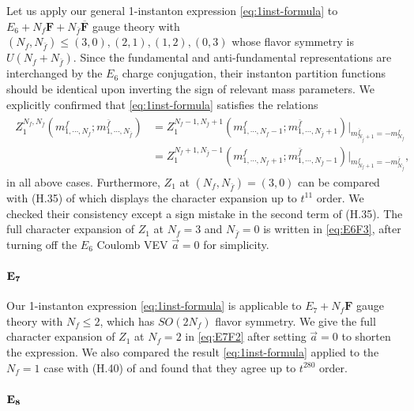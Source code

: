 \documentclass[letterpaper, 11pt]{article}
\begin{document}
{Let us apply our general 1-instanton expression \eqref{eq:1inst-formula} to $E_6 + N_f \mathbf{F} + N_{\bar{f}}\overline{\mathbf{F}}$ gauge theory with $(N_f,N_{\bar{f}}) \leq (3,0), (2,1), (1,2),(0,3)$ whose flavor symmetry is $U(N_f 
+ N_{\bar{f}})$. Since the fundamental and anti-fundamental representations are interchanged by the $E_6$ charge conjugation, their instanton partition functions should be identical upon inverting the sign of relevant mass parameters. We explicitly confirmed that \eqref{eq:1inst-formula} satisfies the relations
\begin{align}
\begin{split}
  Z_{1}^{N_f,N_{\bar{f}}}(m^f_{1, \cdots, N_f}; m^{\bar{f}}_{1,\cdots,N_{\bar{f}}}) &= Z_{1}^{N_f-1,N_{\bar{f}}+1}(m^f_{1, \cdots, N_f-1}; m^{\bar{f}}_{1,\cdots,N_{\bar{f}}+1})\big|_{m^{\bar{f}}_{N_{\bar{f}}+1} = -m^f_{N_f}}\\ 
  &= Z_{1}^{N_f+1,N_{\bar{f}}-1}(m^f_{1, \cdots, N_f+1}; m^{\bar{f}}_{1,\cdots,N_{\bar{f}}-1})\big|_{m^{f}_{N_{f}+1} = -m^{\bar{f}}_{N_{\bar{f}}}},
\end{split}
\end{align}
in all above cases. Furthermore, $Z_1$ at $(N_f, N_{\bar{f}}) = (3,0)$ can be compared with (H.35) of \cite{DelZotto:2018tcj} which displays the character expansion up to $t^{11}$ order. We checked their consistency except a sign mistake in the second term of (H.35). The full character expansion of $Z_1$ at $N_f=3$ and $N_{\bar{f}}=0$ is written in \eqref{eq:E6F3}, after turning off the $E_6$ Coulomb VEV $\vec{a} = 0$ for simplicity.


\paragraph{$\bf E_7$}

Our 1-instanton expression \eqref{eq:1inst-formula} is applicable to $E_7 + N_f\mathbf{F}$ gauge theory with $N_f \leq 2$, which has $SO(2N_f)$ flavor symmetry. We give the full character expansion of $Z_1$ at $N_f=2$ in \eqref{eq:E7F2} after setting $\vec{a}=0$ to shorten the expression. We also compared the result \eqref{eq:1inst-formula} applied to the $N_f = 1$ case with (H.40) of \cite{DelZotto:2018tcj} and found that they agree up to $t^{280}$ order.


\paragraph{$\bf E_8$}

}
\end{document}
